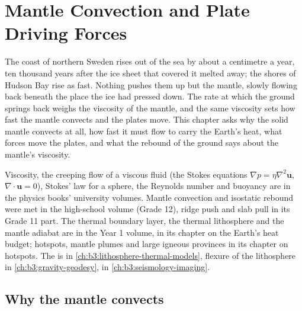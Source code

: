 \chapter{Mantle Convection and Plate Driving Forces}\label{ch:b3:mantle-convection}

The coast of northern Sweden rises out of the sea by about a centimetre a
year, ten thousand years after the ice sheet that covered it melted away; the
shores of Hudson Bay rise as fast. Nothing pushes them up but the mantle,
slowly flowing back beneath the place the ice had pressed down. The rate at
which the ground springs back weighs the viscosity of the mantle, and the same
viscosity sets how fast the mantle convects and the plates move. This chapter
asks why the solid mantle convects at all, how fast it must flow to carry the
Earth's heat, what forces move the plates, and what the rebound of the ground
says about the mantle's viscosity.

\begin{recall}
Viscosity, the creeping flow of a viscous fluid (the Stokes equations
$\nabla p = \eta\nabla^2\mathbf u$, $\nabla\cdot\mathbf u = 0$), Stokes' law
for a sphere, the Reynolds number and buoyancy are in the physics books'
university volumes. Mantle convection and isostatic rebound were met in the
high-school volume (Grade 12), ridge push and slab pull in its Grade 11 part.
The thermal boundary layer, the thermal lithosphere and the mantle adiabat are
in the Year 1 volume, in its chapter on the Earth's heat budget; hotspots,
mantle plumes and large igneous provinces in its chapter on hotspots. The
 is in \cref{ch:b3:lithosphere-thermal-models},
flexure of the lithosphere in \cref{ch:b3:gravity-geodesy},  in \cref{ch:b3:seismology-imaging}.
\end{recall}

\section{Why the mantle convects}

